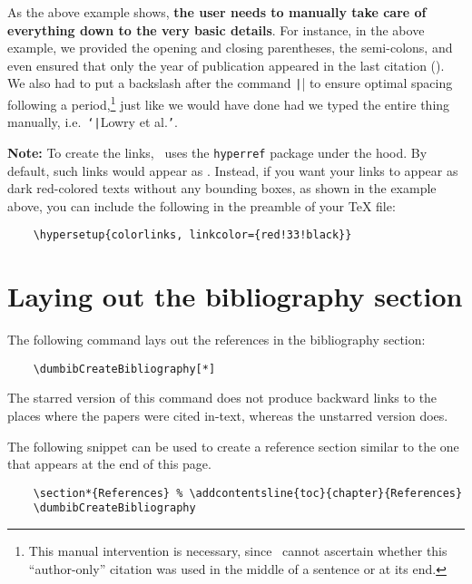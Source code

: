 \documentclass[letter, 11pt]{article}
\begin{document}
  As the above example shows, \textbf{the user needs to manually take care of everything down to the very basic details}. For instance, in the above example, we provided the opening and closing parentheses, the semi-colons, and even ensured that only the year of publication appeared in the last citation (\cite*{bach2023b}). We also had to put a backslash after the command \texttt|\cite[a]{lowry_etal1951}| to ensure optimal spacing following a period,\footnote{This manual intervention is necessary, since \dumbib\ cannot ascertain whether this ``author-only'' citation was used in the middle of a sentence or at its end.} just like we would have done had we typed the entire thing manually, i.e.\ \texttt{`}\texttt|Lowry et al.\|\texttt{'}.

  \noindent \textbf{Note:}  To create the links, \dumbib\ uses the \texttt{hyperref} package under the hood. By default, such links would appear as . Instead, if you want your links to appear as dark red-colored texts without any bounding boxes, as shown in the example above, you can include the following in the preamble of your \TeX{} file:
  \begin{verbatim}
    \hypersetup{colorlinks, linkcolor={red!33!black}}
  \end{verbatim}
  
  \section{Laying out the bibliography section}
  The following command lays out the references in the bibliography section:
  \begin{verbatim}
    \dumbibCreateBibliography[*]
  \end{verbatim}
  The starred version of this command does not produce backward links to the places where the papers were cited in-text, whereas the unstarred version does.

  The following snippet can be used to create a reference section similar to the one that appears at the end of this page.

  \begin{verbatim}
    \section*{References} % \addcontentsline{toc}{chapter}{References}
    \dumbibCreateBibliography
  \end{verbatim}
\end{document}
